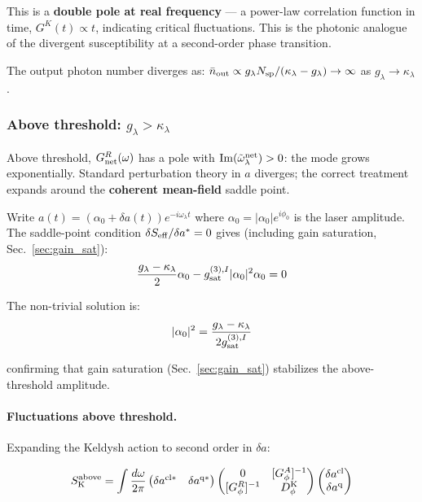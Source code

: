 \documentclass[12pt]{article}
\newcommand{\eff}{{\rm eff}}
\newcommand{\cl}{{\rm cl}}
\newcommand{\q}{{\rm q}}
\newcommand{\Keldysh}{{\rm K}}
\newcommand{\tomega}{\tilde{\omega}}
\begin{document}
This is a \textbf{double pole at real frequency} --- a power-law
correlation function in time, $G^K(t)\propto t$, indicating
critical fluctuations.  This is the photonic analogue of the
divergent susceptibility at a second-order phase transition.

The output photon number diverges as:
$\bar{n}_{\rm out} \propto g_\lambda N_{\rm sp}/(\kappa_\lambda - g_\lambda)
\to\infty$ as $g_\lambda\to\kappa_\lambda$.

\subsubsection*{Above threshold: $g_\lambda > \kappa_\lambda$}

Above threshold, $G^R_{\rm net}(\omega)$ has a pole with
$\mathrm{Im}(\tomega_\lambda^{\rm net}) > 0$: the mode grows exponentially.
Standard perturbation theory in $a$ diverges; the correct treatment
expands around the \textbf{coherent mean-field} saddle point.

Write $a(t) = (\alpha_0 + \delta a(t))e^{-i\omega_\lambda t}$ where
$\alpha_0 = |\alpha_0|e^{i\phi_0}$ is the laser amplitude.  The
saddle-point condition $\delta S_\eff/\delta a^* = 0$ gives
(including gain saturation, Sec.~\ref{sec:gain_sat}):
\begin{equation}
  \frac{g_\lambda - \kappa_\lambda}{2}\alpha_0
  - g^{(3),I}_{\rm sat}|\alpha_0|^2\alpha_0 = 0
  \label{eq:saddle_point_gain}
\end{equation}

The non-trivial solution is:
\begin{equation}
  |\alpha_0|^2 = \frac{g_\lambda - \kappa_\lambda}{2g^{(3),I}_{\rm sat}}
  \label{eq:laser_amplitude}
\end{equation}

confirming that gain saturation (Sec.~\ref{sec:gain_sat}) stabilizes
the above-threshold amplitude.

\paragraph{Fluctuations above threshold.}
Expanding the Keldysh action to second order in $\delta a$:

\begin{equation}
  S_\Keldysh^{\rm above} = \int\frac{d\omega}{2\pi}
  \begin{pmatrix}\delta a^{\cl*} & \delta a^{\q*}\end{pmatrix}
  \begin{pmatrix}0 & [G^A_\phi]^{-1}\\
  [G^R_\phi]^{-1} & D^\Keldysh_\phi\end{pmatrix}
  \begin{pmatrix}\delta a^\cl\\\delta a^\q\end{pmatrix}
  \label{eq:above_threshold_action}
\end{equation}
\end{document}

